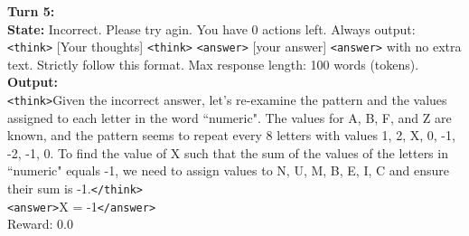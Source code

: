 \begin{tcolorbox}[breakable, colback=gray!2, colframe=black, boxrule=0.5pt, arc=2pt, width=\linewidth, title=Box 4: Multi-Turn Rollout before training]
\vspace{4pt}
\textbf{Turn 5:} \\
\textbf{State:}
Incorrect. Please try agin.
You have 0 actions left. Always output: \texttt{<think>} [Your thoughts] \texttt{<think>} \texttt{<answer>} [your answer] \texttt{<answer>} with no extra text. Strictly follow this format. Max response length: 100 words (tokens). \\
\textbf{Output:} \\
\texttt{<think>}Given the incorrect answer, let's re-examine the pattern and the values assigned to each letter in the word ``numeric". The values for A, B, F, and Z are known, and the pattern seems to repeat every 8 letters with values 1, 2, X, 0, -1, -2, -1, 0. To find the value of X such that the sum of the values of the letters in ``numeric" equals -1, we need to assign values to N, U, M, B, E, I, C and ensure their sum is -1.\texttt{</think>} \\
\texttt{<answer>}X = -1\texttt{</answer>} \\
Reward: 0.0
\end{tcolorbox}


